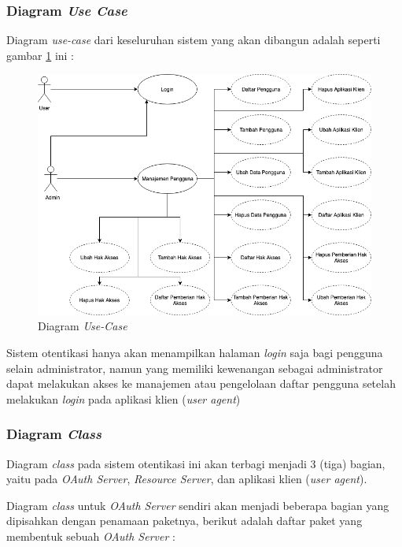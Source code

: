 \documentclass[pdftex,12pt, oneside]{article}
\begin{document}
\subsubsection{Diagram \textit{Use Case}}

Diagram \textit{use-case} dari keseluruhan sistem yang akan dibangun adalah seperti gambar \ref{fig:use-case} ini :

\begin{figure}[H]	
	\centering
	\includegraphics[width=1\textwidth]{resources/use-case-diag}
	\caption{Diagram \textit{Use-Case}}
	\label{fig:use-case}
\end{figure}

Sistem otentikasi hanya akan menampilkan halaman \textit{login} saja bagi pengguna selain administrator, namun yang memiliki kewenangan sebagai administrator dapat melakukan akses ke manajemen atau pengelolaan daftar pengguna setelah melakukan \textit{login} pada aplikasi klien (\textit{user agent})

\subsubsection{Diagram \textit{Class}}

Diagram \textit{class} pada sistem otentikasi ini akan terbagi menjadi 3 (tiga) bagian, yaitu pada \textit{OAuth Server}, \textit{Resource Server}, dan aplikasi klien (\textit{user agent}).

Diagram \textit{class} untuk \textit{OAuth Server} sendiri akan menjadi beberapa bagian yang dipisahkan dengan penamaan paketnya, berikut adalah daftar paket yang membentuk sebuah \textit{OAuth Server} : 
\end{document}
